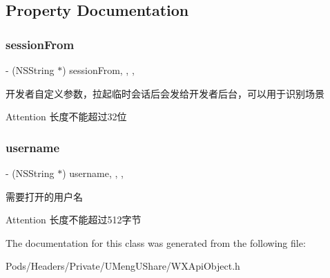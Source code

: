 \subsection{Property Documentation}
\mbox{\label{interface_open_temp_session_req_a9f5ba3fecdd55e5bdc51990c563fabf8}} 
\subsubsection{\texorpdfstring{session\+From}{sessionFrom}}
{\footnotesize\ttfamily -\/ (N\+S\+String $\ast$) session\+From\hspace{0.3cm}{\ttfamily [read]}, {\ttfamily [write]}, {\ttfamily [nonatomic]}, {\ttfamily [retain]}}

开发者自定义参数，拉起临时会话后会发给开发者后台，可以用于识别场景 \begin{DoxyAttention}{Attention}
长度不能超过32位 
\end{DoxyAttention}
\mbox{\label{interface_open_temp_session_req_acf03474890a4c03bf442fbd97094931b}} 
\subsubsection{\texorpdfstring{username}{username}}
{\footnotesize\ttfamily -\/ (N\+S\+String $\ast$) username\hspace{0.3cm}{\ttfamily [read]}, {\ttfamily [write]}, {\ttfamily [nonatomic]}, {\ttfamily [retain]}}

需要打开的用户名 \begin{DoxyAttention}{Attention}
长度不能超过512字节 
\end{DoxyAttention}


The documentation for this class was generated from the following file\+:\begin{DoxyCompactItemize}
\item 
Pods/\+Headers/\+Private/\+U\+Meng\+U\+Share/W\+X\+Api\+Object.\+h\end{DoxyCompactItemize}
